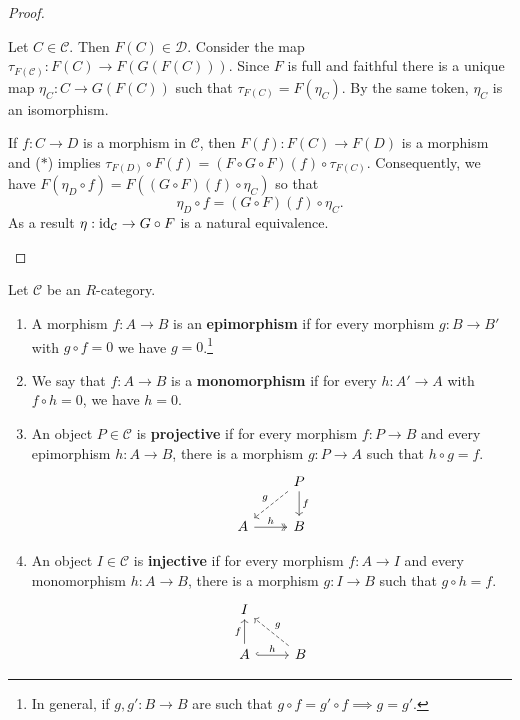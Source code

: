 \begin{proof}
\begin{addmargin}[1cm]{0cm}
  Let $C \in \mathcal{C}$. Then $F(C) \in \mathcal{D}$. Consider the map $\tau_{F(\mathcal{C})}: F(C) \to F(G(F(C)))$. Since $F$ is
  full and faithful there is a unique map $\eta_C: C \to G(F(C))$ such that $\tau_{F(C)}
  = F(\eta_C)$. By the same token, $\eta_C$ is an isomorphism.
  
  If $f: C \to D$ is a morphism in $\mathcal{C}$, then $F(f): F(C) \to F(D)$ is a morphism and
  ($*$) implies $\tau_{F(D)} \circ F(f) = (F \circ G \circ F)(f) \circ \tau_{F(C)}$. Consequently, we have
  $F(\eta_D \circ f) = F((G \circ F)(f) \circ \eta_C)$ so that
    \[ \eta_D \circ f = (G \circ F)(f) \circ \eta_C. \]
  As a result $\eta: \operatorname{id}_\mathcal{C} \to G \circ F$ is a natural equivalence.\qedhere
\end{addmargin}
\end{proof}


\begin{definition}
Let $\mathcal{C}$ be an $R$-category.
  \begin{enumerate}
  \item A morphism $f: A \to B$ is an \textbf{epimorphism} if
    for every morphism $g: B \to B'$ with $g \circ f = 0$ we have $g = 0$.\footnote{In general, if
    $g, g': B \to B$ are such that $g \circ f = g' \circ f \implies g = g'$.}
  \item We say that $f: A \to B$ is a \textbf{monomorphism} if for every $h: A' \to A$
    with $f \circ h = 0$, we have $h = 0$.
  \item An object $P \in \mathcal{C}$ is \textbf{projective} if for every morphism $f: P \to B$ and
    every epimorphism $h: A \to B$, there is a morphism $g: P \to A$ such that $h \circ
    g = f$.
    \[
      \begin{tikzcd}
        & P \dlar["g"', dashrightarrow] \dar["f"]\\
        A \rar["h", twoheadrightarrow]& B
      \end{tikzcd}
    \]
  \item An object $I \in \mathcal{C}$ is \textbf{injective} if for every morphism $f: A \to I$ and
    every monomorphism $h: A \to B$, there is a morphism $g: I \to B$ such that $g \circ
    h = f$.
    \[
      \begin{tikzcd}
        I  & \\
        A \uar["f"] \rar["h",hook] & B \ular["g"', dashrightarrow]
      \end{tikzcd}
    \]
  \end{enumerate}
\end{definition}
